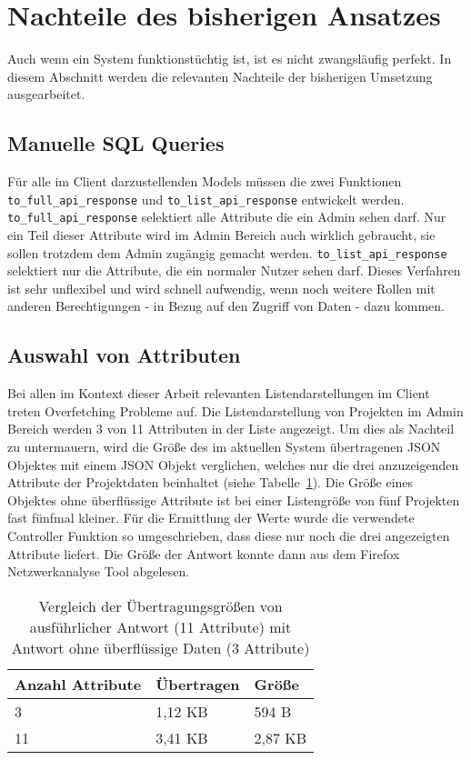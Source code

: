 \section{Nachteile des bisherigen Ansatzes}
\label{sec:requirements:cons:typescript}
Auch wenn ein System funktionstüchtig ist, ist es nicht zwangsläufig perfekt.
In diesem Abschnitt werden die relevanten Nachteile der bisherigen Umsetzung ausgearbeitet.

\subsection{Manuelle SQL Queries}
Für alle im Client darzustellenden Models müssen die zwei Funktionen \texttt{to\_full\_api\_re\-sponse} und \texttt{to\_list\_api\_response} entwickelt werden.
\texttt{to\_full\_api\_response} selektiert alle Attribute die ein Admin sehen darf. Nur ein Teil dieser Attribute wird im Admin Bereich auch wirklich gebraucht, sie sollen trotzdem dem Admin zugängig gemacht werden.
\texttt{to\_list\_api\_response} selektiert nur die Attribute, die ein normaler Nutzer sehen darf. Dieses Verfahren ist sehr unflexibel und wird schnell aufwendig, wenn noch weitere Rollen mit anderen Berechtigungen - in Bezug auf den Zugriff von Daten - dazu kommen.

\subsection{Auswahl von Attributen}
\label{sec:requirements:cons:attributes}
Bei allen im Kontext dieser Arbeit relevanten Listendarstellungen im Client treten Overfetching Probleme auf.
Die Listendarstellung von Projekten im Admin Bereich werden 3 von 11 Attributen in der Liste angezeigt. 
Um dies als Nachteil zu untermauern, wird die Größe des im aktuellen System übertragenen JSON Objektes mit einem JSON Objekt verglichen, welches nur die drei anzuzeigenden Attribute der Projektdaten beinhaltet (siehe Tabelle~\ref{tbl:req:data-transfer}). Die Größe eines Objektes ohne überflüssige Attribute ist bei einer Listengröße von fünf Projekten fast fünfmal kleiner.
Für die Ermittlung der Werte wurde die verwendete Controller Funktion so umgeschrieben, dass diese nur noch die drei angezeigten Attribute liefert. Die Größe der Antwort konnte dann aus dem Firefox Netzwerkanalyse Tool abgelesen.

\begin{table}[h!]
	\begin{tabular}{|p{}|p{}|p{}|}
		\hline
		\textbf{Anzahl Attribute} & \textbf{Übertragen}  & \textbf{Größe} \\ \hline
		3 & 1,12 KB & 594 B \\ \hline
		11 & 3,41 KB & 2,87 KB \\ \hline
	\end{tabular}
	\vspace{5pt}
	\caption{Vergleich der Übertragungsgrößen von ausführlicher Antwort (11 Attribute) mit Antwort ohne überflüssige Daten (3 Attribute)}
	\label{tbl:req:data-transfer}
\end{table}

